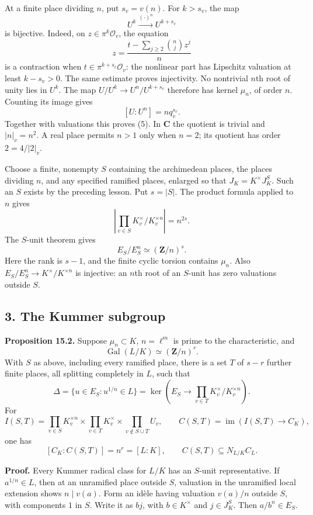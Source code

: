 \documentclass[11pt,a4paper]{article}
\begin{document}
At a finite place dividing \(n\), put \(s_v=v(n)\). For \(k>s_v\), the
map \[
U^k\xrightarrow{(\cdot)^n}U^{k+s_v}
\tag{6}
\] is bijective. Indeed, on \(z\in\pi^k\mathcal O_v\), the equation \[
z=\frac{t-\sum_{j\geq2}\binom nj z^j}{n}
\] is a contraction when \(t\in\pi^{k+s_v}\mathcal O_v\): the nonlinear
part has Lipschitz valuation at least \(k-s_v>0\). The same estimate
proves injectivity. No nontrivial \(n\)th root of unity lies in \(U^k\).
The map \(U/U^k\to U^n/U^{k+s_v}\) therefore has kernel \(\mu_n\), of
order \(n\). Counting its image gives \[
[U:U^n]=nq_v^{s_v}.
\] Together with valuations this proves (5). In \(\mathbf C\) the
quotient is trivial and \(|n|_v=n^2\). A real place permits \(n>1\) only
when \(n=2\); its quotient has order \(2=4/|2|_v\).

Choose a finite, nonempty \(S\) containing the archimedean places, the
places dividing \(n\), and any specified ramified places, enlarged so
that \(J_K=K^\times J_K^S\). Such an \(S\) exists by the preceding
lesson. Put \(s=|S|\). The product formula applied to \(n\) gives \[
\left|\prod_{v\in S}K_v^\times/K_v^{\times n}\right|=n^{2s}.
\tag{7}
\] The \(S\)-unit theorem gives \[
E_S/E_S^n\simeq(\mathbf Z/n)^s.
\tag{8}
\] Here the rank is \(s-1\), and the finite cyclic torsion contains
\(\mu_n\). Also \(E_S/E_S^n\to K^\times/K^{\times n}\) is injective: an
\(n\)th root of an \(S\)-unit has zero valuations outside \(S\).

\subsection{3. The Kummer subgroup}\label{the-kummer-subgroup}

\textbf{Proposition 15.2.} Suppose \(\mu_n\subset K\), \(n=\ell^m\) is
prime to the characteristic, and \[
\operatorname{Gal}(L/K)\simeq(\mathbf Z/n)^r.
\] With \(S\) as above, including every ramified place, there is a set
\(T\) of \(s-r\) further finite places, all splitting completely in
\(L\), such that \[
\Delta=\{u\in E_S:u^{1/n}\in L\}
=\ker\left(E_S\longrightarrow
\prod_{v\in T}K_v^\times/K_v^{\times n}\right).
\tag{9}
\] For \[
I(S,T)=
\prod_{v\in S}K_v^{\times n}
\times\prod_{v\in T}K_v^\times
\times\prod_{v\notin S\cup T}U_v,
\qquad C(S,T)=\operatorname{im}(I(S,T)\to C_K),
\tag{10}
\] one has \[
[C_K:C(S,T)]=n^r=[L:K],
\qquad C(S,T)\subseteq N_{L/K}C_L.
\tag{11}
\]

\textbf{Proof.} Every Kummer radical class for \(L/K\) has an \(S\)-unit
representative. If \(a^{1/n}\in L\), then at an unramified place outside
\(S\), valuation in the unramified local extension shows \(n\mid v(a)\).
Form an idèle having valuation \(v(a)/n\) outside \(S\), with components
\(1\) in \(S\). Write it as \(b j\), with \(b\in K^\times\) and
\(j\in J_K^S\). Then \(a/b^n\in E_S\).
\end{document}
